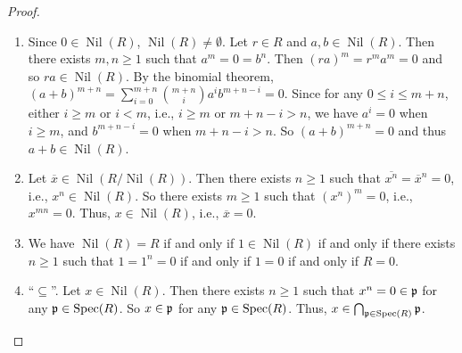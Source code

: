 \begin{proof}
    \begin{enumerate}
        \item Since $0 \in \operatorname{Nil}(R)$, $\operatorname{Nil}(R) \neq \emptyset$. Let $r \in R$ and $a,b \in \operatorname{Nil}(R)$. Then there exists $m,n \geq 1$ such that $a^m = 0 = b^n$. Then $(ra)^m = r^ma^m = 0$ and so $ra \in \operatorname{Nil}(R)$. By the binomial theorem, $(a+b)^{m+n} = \sum_{i=0}^{m+n} \binom {m+n} i a^i b^{m+n-i} = 0$. Since for any $0 \leq i \leq m+n$, either $i \geq m$ or $i < m$, i.e., $i \geq m$ or $m+n-i > n$, we have $a^i = 0$ when $i \geq m$, and $b^{m+n-i} = 0 $ when $m + n-i > n$. So $(a+b)^{m+n} = 0$ and thus $a+b \in \operatorname{Nil}(R)$.
        \item Let $\overbar x \in \operatorname{Nil}(R/\operatorname{Nil}(R))$. Then there exists $n \geq 1$ such that $\overbar {x^n} = \overbar x^n = 0$, i.e., $x^n \in \operatorname{Nil}(R)$. So there exists $m \geq 1$ such that $(x^n)^m = 0$, i.e., $x^{mn} = 0$. Thus, $x \in \operatorname{Nil}(R)$, i.e., $\overbar x = 0$.
        \item  We have $\operatorname{Nil}(R) = R$ if and only if $1 \in \operatorname{Nil}(R)$ if and only if there exists $n \geq 1$ such that $1 = 1^n = 0$ if and only if $1 = 0$ if and only if $R = 0$.
        \item ``$\subseteq$''. Let $x \in \operatorname{Nil}(R)$. Then there exists $n \geq 1$ such that $x^n = 0 \in \mathfrak{p}$ for any $\mathfrak{p} \in \operatorname{Spec}(R)$. So $x \in \mathfrak{p}$ for any $\mathfrak{p} \in \operatorname{Spec}(R)$. Thus, $x \in \bigcap_{\mathfrak{p} \in \operatorname{Spec}(R)} \mathfrak{p}$. \par

\end{enumerate}
\end{proof}
